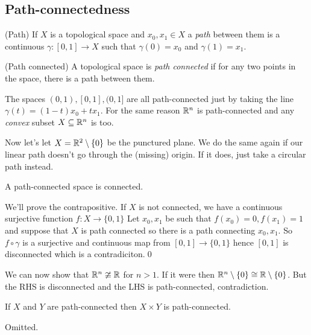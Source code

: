 \documentclass{article}
\begin{document}
\subsection{Path-connectedness}
\begin{definition}
	(Path) If $ X $ is a topological space and $ x_0,x_1\in X $ a \textit{path} between them is a continuous $ \gamma:[0,1]\to X $ such that $ \gamma(0)=x_0 $ and $ \gamma(1)= x_1 $.
\end{definition}
\begin{definition}
	(Path connected) A topological space is \textit{path connected} if for any two points in the space, there is a path between them.
\end{definition}
The spaces $ (0,1), [0,1], (0,1] $ are all path-connected just by taking the line $ \gamma(t) = (1-t)x_0 + tx_1 $. For the same reason $ \mathbb{R}^n $ is path-connected and any \textit{convex} subset $ X\subseteq \mathbb{R}^n $ is too.\par
Now let's let $ X = \mathbb{R}^2 \setminus \{0\} $ be the punctured plane. We do the same again if our linear path doesn't go through the (missing) origin. If it does, just take a circular path instead.
\begin{proposition}
  A path-connected space is connected.
\end{proposition}
We'll prove the contrapositive. If $ X $ is not connected, we have a continuous surjective function $ f:X\to \{0,1\} $ Let $ x_0,x_1 $ be such that $ f(x_0)=0, f(x_1)=1 $ and suppose that $ X $ is path connected so there is a path connecting $ x_0,x_1 $. So $ f\circ \gamma $ is a surjective and continuous map from $ [0,1]\to \{0,1\} $ hence $ [0,1] $ is disconnected which is a contradiciton.\qed
\par
We can now show that $ \mathbb{R}^n\ncong \mathbb{R} $ for $ n>1 $. If it were then $ \mathbb{R}^n\setminus \{0\}\cong \mathbb{R}\setminus \{0\} $. But the RHS is disconnected and the LHS is path-connected, contradiction.
\begin{proposition}
  If $ X $ and $ Y $ are path-connected then $ X\times Y $ is path-connected.
\end{proposition}
\pf Omitted.
\end{document}

